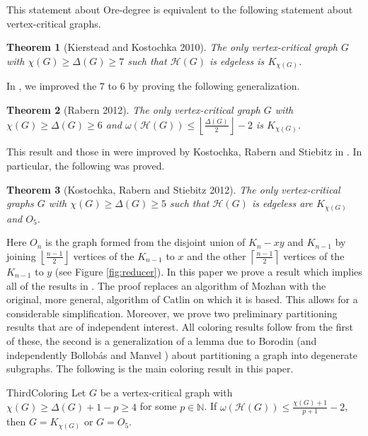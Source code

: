 \documentclass[12pt]{amsart}
\theoremstyle{plain}
\newtheorem{thm}{Theorem}[section]
\theoremstyle{definition}
\theoremstyle{remark}
\newcommand{\fancy}[1]{\mathcal{#1}}
\newcommand{\IN}{\mathbb{N}}
\newcommand{\ceil}[1]{\left\lceil#1\right\rceil}
\newcommand{\floor}[1]{\left\lfloor#1\right\rfloor}
\begin{document}
This statement about Ore-degree is equivalent to the following statement about vertex-critical graphs.

\begin{thm}[Kierstead and Kostochka \cite{kierstead2009ore} 2010]
The only vertex-critical graph $G$ with $\chi(G) \geq \Delta(G) \geq 7$ such that $\fancy{H}(G)$ is edgeless is $K_{\chi(G)}$.
\end{thm}

In \cite{rabern2010a}, we improved the $7$ to $6$ by proving the following generalization.

\begin{thm}[Rabern \cite{rabern2010a} 2012]
The only vertex-critical graph $G$ with $\chi(G) \geq \Delta(G) \geq 6$ and $\omega(\fancy{H}(G)) \leq \floor{\frac{\Delta(G)}{2}} - 2$ is $K_{\chi(G)}$.
\end{thm}

This result and those in \cite{rabern2010b} were improved by Kostochka, Rabern and Stiebitz in \cite{krs_one}.  In particular, the following was proved.

\begin{thm}[Kostochka, Rabern and Stiebitz \cite{krs_one} 2012]
The only vertex-critical graphs $G$ with $\chi(G) \geq \Delta(G) \geq 5$ such that $\fancy{H}(G)$ is edgeless are $K_{\chi(G)}$ and $O_5$.
\end{thm}



Here $O_n$ is the graph formed from the disjoint union of $K_n - xy$ and
$K_{n-1}$ by joining $\floor{\frac{n-1}{2}}$ vertices of the $K_{n-1}$ to $x$
and the other $\ceil{\frac{n-1}{2}}$ vertices of the $K_{n-1}$ to $y$ (see
Figure \ref{fig:reducer}). In this paper we prove a result which implies all of the results in \cite{krs_one}.  The proof replaces an algorithm of Mozhan \cite{mozhan1983} with the original, more general, algorithm of Catlin \cite{CatlinAnotherBound} on which it is based. This allows for a considerable simplification.  Moreover, we prove two preliminary partitioning results that are of independent interest.  All coloring results follow from the first of these, the second is a generalization of a lemma due to Borodin \cite{borodin1976decomposition} (and independently Bollob\'as and Manvel \cite{bollobasManvel}) about partitioning a graph into degenerate subgraphs.  The following is the main coloring result in this paper.

   \begin{repcor}{ThirdColoring}
	Let $G$ be a vertex-critical graph with $\chi(G) \geq \Delta(G) + 1 - p \geq 4$
	for some $p \in \IN$.  If $\omega(\fancy{H}(G)) \leq \frac{\chi(G) + 1}{p + 1} - 2$,
	then $G = K_{\chi(G)}$ or $G = O_5$.
	\end{repcor}
\end{document}
